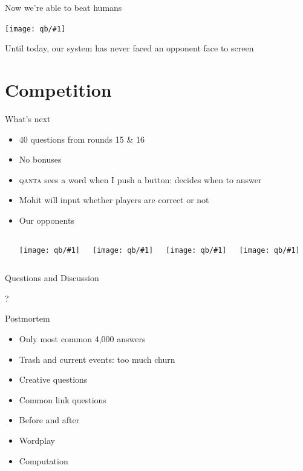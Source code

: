 \documentclass[compress]{beamer}
\newcommand{\gfxq}[2]{
\begin{center}
	\texttt{[image: qb/\#1]}
\end{center}
}
\begin{document}
\begin{frame}{Now we're able to beat humans}

  \gfxq{human_history}{1.0}
  \pause
  
 Until today, our system has never faced an opponent face to screen

\end{frame}


\section{Competition}

\begin{frame}{What's next}

	\begin{itemize}
		\item 40 questions from rounds 15 \& 16
		\item No bonuses
		\item \textsc{qanta} sees a word when I push a button: decides when to answer
		\item Mohit will input whether players are correct or not
		\pause
		\item Our opponents
		\begin{columns}
				\gfxq{colby_jeo}{1.0}
				\gfxq{ben_jeo}{1.0}
				\gfxq{alex_jeo}{1.0}
				\gfxq{kristin_jeo}{1.0}						
		\end{columns}
	\end{itemize}

\end{frame}

\begin{frame}{Questions and Discussion}

	\begin{center}
	\begin{Huge}
	?
	\end{Huge}
	\end{center}

\end{frame}


\begin{frame}{Postmortem}

\begin{itemize}
	\item Only most common 4,000 answers
	\item Trash and current events: too much churn
	\item Creative questions
	\item Common link questions
	\item Before and after
	\item Wordplay
	\item Computation
\end{itemize}


\end{frame}
\end{document}
